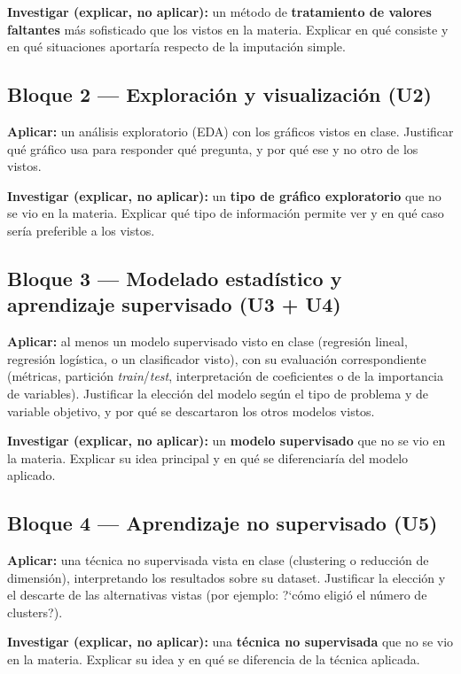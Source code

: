 \documentclass[11pt,a4paper]{article}
\begin{document}
\textbf{Investigar (explicar, no aplicar):} un m\'etodo de \textbf{tratamiento de valores faltantes} m\'as sofisticado que los vistos en la materia. Explicar en qu\'e consiste y en qu\'e situaciones aportar\'ia respecto de la imputaci\'on simple.

\subsection*{Bloque 2 --- Exploraci\'on y visualizaci\'on (U2)}
\textbf{Aplicar:} un an\'alisis exploratorio (EDA) con los gr\'aficos vistos en clase. Justificar qu\'e gr\'afico usa para responder qu\'e pregunta, y por qu\'e ese y no otro de los vistos.

\textbf{Investigar (explicar, no aplicar):} un \textbf{tipo de gr\'afico exploratorio} que no se vio en la materia. Explicar qu\'e tipo de informaci\'on permite ver y en qu\'e caso ser\'ia preferible a los vistos.

\subsection*{Bloque 3 --- Modelado estad\'istico y aprendizaje supervisado (U3 + U4)}
\textbf{Aplicar:} al menos un modelo supervisado visto en clase (regresi\'on lineal, regresi\'on log\'istica, o un clasificador visto), con su evaluaci\'on correspondiente (m\'etricas, partici\'on \textit{train}/\textit{test}, interpretaci\'on de coeficientes o de la importancia de variables). Justificar la elecci\'on del modelo seg\'un el tipo de problema y de variable objetivo, y por qu\'e se descartaron los otros modelos vistos.

\textbf{Investigar (explicar, no aplicar):} un \textbf{modelo supervisado} que no se vio en la materia. Explicar su idea principal y en qu\'e se diferenciar\'ia del modelo aplicado.

\subsection*{Bloque 4 --- Aprendizaje no supervisado (U5)}
\textbf{Aplicar:} una t\'ecnica no supervisada vista en clase (clustering o reducci\'on de dimensi\'on), interpretando los resultados sobre su dataset. Justificar la elecci\'on y el descarte de las alternativas vistas (por ejemplo: ?`c\'omo eligi\'o el n\'umero de clusters?).

\textbf{Investigar (explicar, no aplicar):} una \textbf{t\'ecnica no supervisada} que no se vio en la materia. Explicar su idea y en qu\'e se diferencia de la t\'ecnica aplicada.
\end{document}
